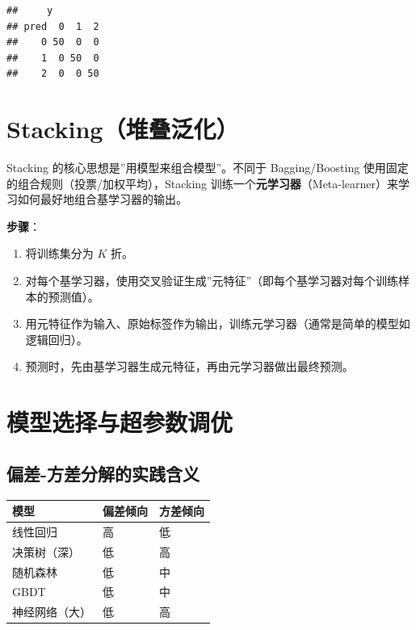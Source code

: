 \documentclass[
]{book}
\providecommand{\tightlist}{%
  \setlength{\itemsep}{0pt}\setlength{\parskip}{0pt}}
\begin{document}
\begin{verbatim}
##     y
## pred  0  1  2
##    0 50  0  0
##    1  0 50  0
##    2  0  0 50
\end{verbatim}

\section{Stacking（堆叠泛化）}\label{stackingux5806ux53e0ux6cdbux5316}

Stacking 的核心思想是''用模型来组合模型''。不同于 Bagging/Boosting 使用固定的组合规则（投票/加权平均），Stacking 训练一个\textbf{元学习器}（Meta-learner）来学习如何最好地组合基学习器的输出。

\textbf{步骤}：

\begin{enumerate}
\def\labelenumi{\arabic{enumi}.}
\tightlist
\item
  将训练集分为 \(K\) 折。
\item
  对每个基学习器，使用交叉验证生成''元特征''（即每个基学习器对每个训练样本的预测值）。
\item
  用元特征作为输入、原始标签作为输出，训练元学习器（通常是简单的模型如逻辑回归）。
\item
  预测时，先由基学习器生成元特征，再由元学习器做出最终预测。
\end{enumerate}

\section{模型选择与超参数调优}\label{ux6a21ux578bux9009ux62e9ux4e0eux8d85ux53c2ux6570ux8c03ux4f18}

\subsection{偏差-方差分解的实践含义}\label{ux504fux5dee-ux65b9ux5deeux5206ux89e3ux7684ux5b9eux8df5ux542bux4e49}

\begin{longtable}[]{@{}lll@{}}
\toprule\noalign{}
模型 & 偏差倾向 & 方差倾向 \\
\midrule\noalign{}
\endhead
\bottomrule\noalign{}
\endlastfoot
线性回归 & 高 & 低 \\
决策树（深） & 低 & 高 \\
随机森林 & 低 & 中 \\
GBDT & 低 & 中 \\
神经网络（大） & 低 & 高 \\
\end{longtable}
\end{document}
